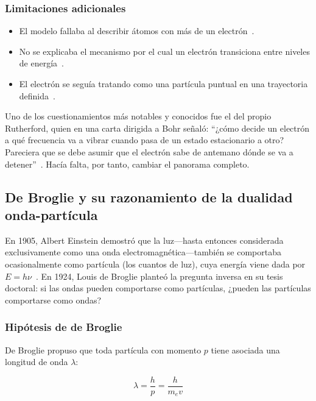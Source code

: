 \documentclass[11pt,a4paper,spanish]{book}
\begin{document}
\subsubsection{Limitaciones adicionales}
\begin{itemize}[nosep]
  \item El modelo fallaba al describir átomos con más de un
    electrón~\citep{bohr1913,sommerfeld1916}.
  \item No se explicaba el mecanismo por el cual un electrón
    transiciona entre niveles de energía~\citep{rutherford1913carta}.
  \item El electrón se seguía tratando como una partícula puntual en
    una trayectoria definida~\citep{debroglie1924}.
\end{itemize}
Uno de los cuestionamientos más notables y conocidos fue el del
propio Rutherford, quien en una carta dirigida a Bohr señaló: ``¿cómo
decide un electrón a qué frecuencia va a vibrar cuando pasa de un
estado estacionario a otro? Pareciera que se debe asumir que el
electrón sabe de antemano dónde se va a
detener''~\citep{rutherford1913carta}. Hacía falta, por tanto,
cambiar el panorama completo.

\subsection{De Broglie y su razonamiento de la dualidad onda-partícula}

En 1905, Albert Einstein demostró que la luz—hasta entonces
considerada exclusivamente como una onda electromagnética—también se
comportaba ocasionalmente como partícula (los cuantos de luz), cuya
energía viene dada por \(E =
h\nu\)~\citep{einsteina1905_photoelectric}. En 1924, Louis de Broglie
planteó la pregunta inversa en su tesis doctoral: si las ondas pueden
comportarse como partículas, ¿pueden las partículas comportarse como
ondas?~\citep{debroglie1924}

\subsubsection{Hipótesis de de Broglie}

De Broglie propuso que toda partícula con momento
\(p\) tiene asociada una longitud de onda \(\lambda\):

\begin{equation}
  \lambda = \frac{h}{p} = \frac{h}{m_e v}
  \label{eq:debroglie}
\end{equation}
\end{document}
